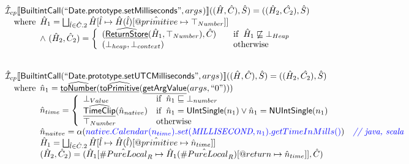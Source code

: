 \documentclass{article}
\makeatletter
\newcommand{\SF}[1]{\mbox{\textsf{#1}}}
\newcommand{\comment}[1]{\textit{#1}}
\newcommand{\wherec}[1]{{\rm where}\begin{array}[t]{l}#1\end{array}}
\newcommand{\ifc}[1]{{\rm if}\begin{array}[t]{l}#1\end{array}}
\newcommand{\owc}{{\rm otherwise}}
\newcommand{\aI}{\hat{\mathcal{I}}}
\newcommand{\lbr}{\llbracket}
\newcommand{\rbr}{\rrbracket}
\newcommand{\hf}[1]{\underline{\sf #1}}
\newcommand{\ahf}[1]{\widehat{\underline{\sf #1}}}
\newcommand{\varprop}[1]{@#1}
\newcommand{\avarloc}[1]{\hat{\##1}}
\newcommand{\avarprop}[1]{\hat{@#1}}
\def\inblue{\color{blue}}
\def\inblue{\color{blue}}
\makeatother
\begin{document}
\[\begin{array}{l}
\aI _{cp}\lbr \SF{BuiltintCall}(``\SF{Date.prototype.setMilliseconds}",args_{})\rbr((\hat{H},\hat{C}), \hat{S})
  = ((\hat{H}_2, \hat{C_2}), \hat{S})\\
\quad\wherec{
  \hat{H}_1 = \bigsqcup_{\hat{l} \in \hat{C}.2} \hat{H}[\hat{l}
    \mapsto \hat{H}(\hat{l})[\avarprop{primitive} \mapsto \top_{Number}]]\\
  \land\ (\hat{H}_2, \hat{C}_2) = 
    \left\{\begin{array}{l@{\quad\quad}l}
      (\ahf{ReturnStore}(\hat{H}_1, \top_{Number}), \hat{C})
      & \ifc{\hat{H}_1 \not\sqsubseteq \bot_{Heap}}\\
      (\bot_{heap}, \bot_{context}) & \owc \\
    \end{array}\right.\\
  }\\
\\\\

\aI _{cp}\lbr \SF{BuiltintCall}(``\SF{Date.prototype.setUTCMilliseconds}",args_{})\rbr((\hat{H},\hat{C}), \hat{S})
  = ((\hat{H}_2, \hat{C_2}), \hat{S})\\
\quad\wherec{
  \hat{n}_{1} = \ahf{toNumber}(\ahf{toPrimitive}(\hf{getArgValue}(args, ``0")))\\
  \hat{n}_{time} = \left\{\begin{array}{ll}
      \bot_{Value} & \ifc{\hat{n}_{1} \sqsubseteq  \bot_{number}}\\
      \ahf{TimeClip}(\hat{n}_{native})
      & \ifc{\hat{n}_{1} = \SF{UIntSingle}(n_{1}) \lor \hat{n}_{1} = \SF{NUIntSingle}(n_{1}) }\\
      \top_{Number} & \owc
    \end{array}\right.\\
  \hat{n}_{naitve} = \alpha({\inblue native.Calendar(n_{time}).set(\emph{MILLISECOND}, n_{1}).getTimeInMills()})
    \quad\comment{{\inblue // java, scala}}\\  
  \hat{H}_1 = \bigsqcup_{\hat{l} \in \hat{C}.2} \hat{H}[\hat{l}
    \mapsto \hat{H}(\hat{l})[\avarprop{primitive} \mapsto \hat{n}_{time}]]\\
  (\hat{H}_2, \hat{C}_2) = 
    (\hat{H}_1[\avarloc{PureLocal}_R \mapsto \hat{H}_1(\avarloc{PureLocal}_R)
      [\varprop{return} \mapsto \hat{n}_{time}]], \hat{C})\\
  }\\
\\\\
\end{array}
\]
\end{document}

